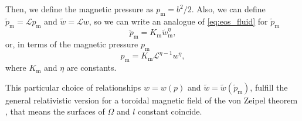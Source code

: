 \documentclass{aa}
\begin{document}
Then, we define the magnetic pressure as $p_{\mathrm{m}} = b^2/2$. Also, we can define $\tilde{p}_{\mathrm{m}} = \mathcal{L} p_{\mathrm{m}}$ and $\tilde{w} = \mathcal{L} w$, so we can write an analogue of \eqref{eq:eos_fluid} for $\tilde{p}_{\mathrm{m}}$
\begin{equation}\label{eq:eos_mag_tilde}
\tilde{p}_{\mathrm{m}} = K_{\mathrm{m}} \tilde{w}_{\mathrm{m}}^{\eta},
\end{equation}
or, in terms of the magnetic pressure $p_{\mathrm{m}}$
\begin{equation}\label{eq:eos_mag}
p_{\mathrm{m}} = K_{\mathrm{m}} \mathcal{L}^{\eta-1} w^{\eta},
\end{equation}
where $K_{\mathrm{m}}$ and $\eta$ are constants.

This particular choice of relationships $w = w(p)$ and $\tilde{w} = \tilde{w}(\tilde{p}_{\mathrm{m}})$, fulfill the general relativistic version for a toroidal magnetic field of the von Zeipel theorem \citep{vonZeipel:1924, Zanotti:2015}, that means the surfaces of $\Omega$ and $l$ constant coincide.
\end{document}
